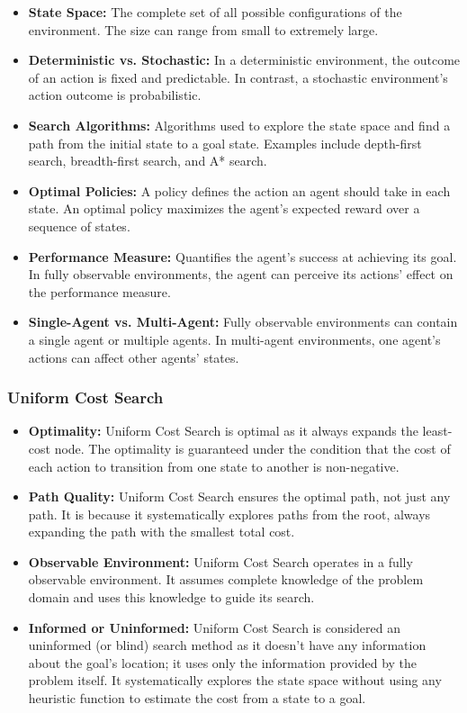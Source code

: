 \documentclass[a4paper,UKenglish,cleveref, autoref, thm-restate]{qlinhta}
\begin{document}
\begin{itemize}
\item \textbf{State Space:} The complete set of all possible configurations of the environment. The size can range from small to extremely large.

\item \textbf{Deterministic vs. Stochastic:} In a deterministic environment, the outcome of an action is fixed and predictable. In contrast, a stochastic environment's action outcome is probabilistic.

\item \textbf{Search Algorithms:} Algorithms used to explore the state space and find a path from the initial state to a goal state. Examples include depth-first search, breadth-first search, and A* search.

\item \textbf{Optimal Policies:} A policy defines the action an agent should take in each state. An optimal policy maximizes the agent's expected reward over a sequence of states.

\item \textbf{Performance Measure:} Quantifies the agent's success at achieving its goal. In fully observable environments, the agent can perceive its actions' effect on the performance measure.

\item \textbf{Single-Agent vs. Multi-Agent:} Fully observable environments can contain a single agent or multiple agents. In multi-agent environments, one agent's actions can affect other agents' states.
\end{itemize}

\subsubsection{Uniform Cost Search}

\begin{itemize}
\item \textbf{Optimality:} Uniform Cost Search is optimal as it always expands the least-cost node. The optimality is guaranteed under the condition that the cost of each action to transition from one state to another is non-negative.
\item \textbf{Path Quality:} Uniform Cost Search ensures the optimal path, not just any path. It is because it systematically explores paths from the root, always expanding the path with the smallest total cost.
\item \textbf{Observable Environment:} Uniform Cost Search operates in a fully observable environment. It assumes complete knowledge of the problem domain and uses this knowledge to guide its search.
\item \textbf{Informed or Uninformed:} Uniform Cost Search is considered an uninformed (or blind) search method as it doesn't have any information about the goal's location; it uses only the information provided by the problem itself. It systematically explores the state space without using any heuristic function to estimate the cost from a state to a goal.
\end{itemize}
\end{document}
